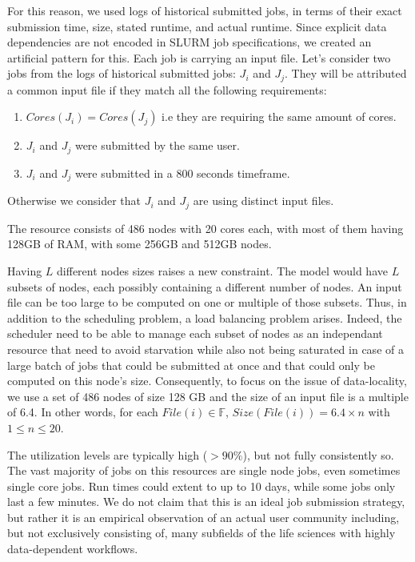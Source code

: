 \documentclass[conference,10pt]{IEEEtran}
\newcommand{\file}{\ensuremath{\mathit{File}}\xspace}
\newcommand{\size}{\ensuremath{\mathit{Size}}\xspace}
\newcommand{\core}{\mathit{Cores}\xspace}
\newcommand{\fileset}{\ensuremath{\mathbb{F}}\xspace}
\begin{document}
For this reason, we used logs of historical submitted jobs, in terms of their exact submission time, size, stated runtime, and actual runtime.
Since explicit data dependencies are not encoded in SLURM job specifications, we created an artificial pattern for this. 
Each job is carrying an input file.
Let's consider two jobs from the logs of historical submitted jobs: $J_i$ and $J_j$.
They will be attributed a common input file if they match all the following requirements:
\begin{enumerate}
	\item $\core(J_i) = \core(J_j)$ i.e they are requiring the same amount of cores.
	\item $J_i$ and $J_j$ were submitted by the same user.
	\item $J_i$ and $J_j$ were submitted in a 800 seconds timeframe.
\end{enumerate}
Otherwise we consider that $J_i$ and $J_j$ are using distinct input files.

The resource consists of 486 nodes with 20 cores each, with most of them having 128GB of RAM, with some 256GB and 512GB nodes. 

Having $L$ different nodes sizes raises a new constraint. The model would have
$L$ subsets of nodes, each possibly containing a different number of nodes.
An input file can be too large to be computed on one or multiple of those subsets.
Thus, in addition to the scheduling problem, a load balancing problem arises.
Indeed, the scheduler need to be able to manage each subset of nodes as an independant 
resource that need to avoid starvation while also not being saturated in case of a large
batch of jobs that could be submitted at once and that could only be computed on this node's size.
Consequently, to focus on the issue of data-locality, we use a set of 486 nodes of size 
128 GB and the size of an input file is a multiple of 6.4.
In other words, for each $\file(i) \in \fileset$, $\size(\file(i)) = 6.4 \times n$ with 
$1 \leq n \leq 20$.

The utilization levels are typically high ($>90\%$), but
not fully consistently so. The vast majority of jobs on this resources are single node jobs, even sometimes single core jobs. Run times
could extent to up to 10 days, while some jobs only last a few minutes. We do not claim that this is an ideal job submission strategy,
but rather it is an empirical observation of an actual user community including, but not exclusively consisting of, many subfields of the life sciences with highly data-dependent workflows.
\end{document}
